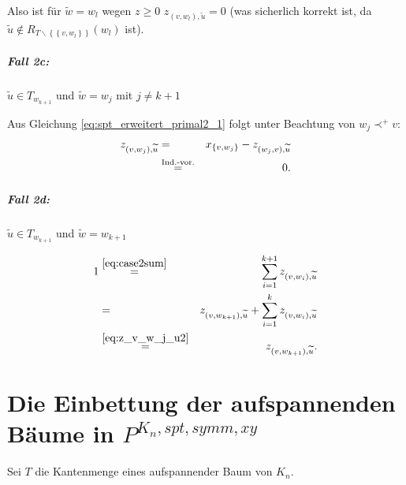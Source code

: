 \documentclass[10p,a4paper,BCOR = 12mm, DIV=15]{scrbook}
\begin{document}
{\begin{bew}
Also ist für $\widetilde{w} = w_l$ wegen $z\geq 0$ $z_{\left(v, w_l\right), \widetilde{u}} = 0$ (was sicherlich korrekt ist, da $\widetilde{u}\notin R_{T\backslash \left\{\left\{v, w_l\right\}\right\}} \left(w_l\right)$ ist).

\subparagraph{Fall 2c:} $\widetilde{u}\in T_{w_{k+1}}$ und $\widetilde{w}=w_j$ mit $j\neq k+1$

Aus Gleichung \eqref{eq:spt_erweitert_primal2_1} folgt unter Beachtung von $w_j \prec^+ v$:
\begin{eqnarray}
z_{\left(v, w_j\right), \widetilde{u}} & = & x_{\left\{v, w_j\right\}} - z_{\left(w_j, v\right), \widetilde{u}} \nonumber \\
& \stackrel{\textnormal{Ind.-vor.}}{=} & 0.  \label{eq:z_v_w_j_u2}
\end{eqnarray}

\subparagraph{Fall 2d:} $\widetilde{u}\in T_{w_{k+1}}$ und $\widetilde{w} = w_{k+1}$

\begin{eqnarray*}
1 & \stackrel{\eqref{eq:case2sum}}{=} & \sum_{i=1}^{k+1} z_{\left(v, w_i\right), \widetilde{u}} \\
& = & z_{\left(v, w_{k+1}\right), \widetilde{u}} + \sum_{i=1}^{k} z_{\left(v, w_i\right), \widetilde{u}} \\
& \stackrel{\eqref{eq:z_v_w_j_u2}}{=} & z_{\left(v, w_{k+1}\right), \widetilde{u}}.
\end{eqnarray*}
\end{bew}

\section{Die Einbettung der aufspannenden Bäume in $P^{K_n, spt, symm, xy}$}

\begin{Sa}
Sei $T$ die Kantenmenge eines aufspannender Baum von $K_n$.


\end{Sa}}
\end{document}
